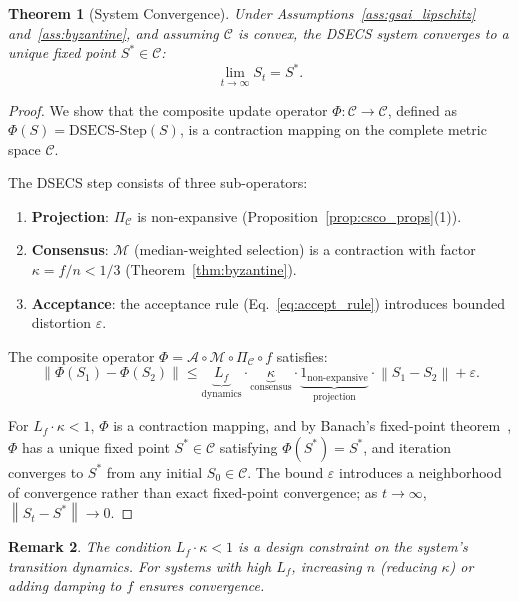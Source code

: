 \documentclass[11pt,letterpaper]{article}
\newtheorem{theorem}{Theorem}[section]
\newtheorem{remark}[theorem]{Remark}
\newcommand{\cC}{\mathcal{C}}
\newcommand{\norm}[1]{\left\lVert#1\right\rVert}
\begin{document}
\begin{theorem}[System Convergence]
\label{thm:convergence}
Under Assumptions~\ref{ass:gsai_lipschitz} and~\ref{ass:byzantine},
and assuming $\cC$ is convex, the DSECS system converges to a unique
fixed point $S^* \in \cC$:
\begin{equation}
    \lim_{t \to \infty} S_t = S^*.
    \label{eq:convergence}
\end{equation}
\end{theorem}
\begin{proof}
We show that the composite update operator $\Phi: \cC \to \cC$,
defined as $\Phi(S) = \text{DSECS-Step}(S)$, is a contraction
mapping on the complete metric space $\cC$.

The DSECS step consists of three sub-operators:
\begin{enumerate}[nosep]
    \item \textbf{Projection}: $\Pi_{\cC}$ is non-expansive
    (Proposition~\ref{prop:csco_props}(1)).
    \item \textbf{Consensus}: $\mathcal{M}$ (median-weighted selection)
    is a contraction with factor $\kappa = f/n < 1/3$
    (Theorem~\ref{thm:byzantine}).
    \item \textbf{Acceptance}: the acceptance rule (Eq.~\eqref{eq:accept_rule})
    introduces bounded distortion $\varepsilon$.
\end{enumerate}

The composite operator $\Phi = \mathcal{A} \circ \mathcal{M} \circ
\Pi_{\cC} \circ f$ satisfies:
\begin{equation}
    \norm{\Phi(S_1) - \Phi(S_2)} \leq
    \underbrace{L_f}_{\text{dynamics}} \cdot
    \underbrace{\kappa}_{\text{consensus}} \cdot
    \underbrace{1_{\text{non-expansive}}}_{\text{projection}}
    \cdot \norm{S_1 - S_2} + \varepsilon.
\end{equation}

For $L_f \cdot \kappa < 1$, $\Phi$ is a contraction mapping, and
by Banach's fixed-point theorem~\cite{banach1922operations},
$\Phi$ has a unique fixed point $S^* \in \cC$ satisfying
$\Phi(S^*) = S^*$, and iteration converges to $S^*$ from any
initial $S_0 \in \cC$. The bound $\varepsilon$ introduces a
neighborhood of convergence rather than exact fixed-point
convergence; as $t \to \infty$, $\norm{S_t - S^*} \to 0$.
\end{proof}

\begin{remark}
The condition $L_f \cdot \kappa < 1$ is a design constraint on the
system's transition dynamics. For systems with high $L_f$, increasing
$n$ (reducing $\kappa$) or adding damping to $f$ ensures convergence.
\end{remark}
\end{document}

